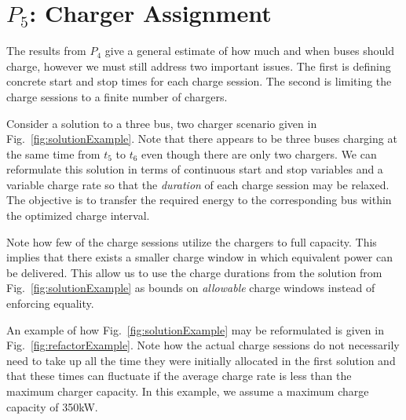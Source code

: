




\section{$P_5$: Charger Assignment\label{sec:chargerAssignment}}

The results from $P_4$ give a general estimate of how much and when buses should charge, however we must still address two important issues. The first is defining concrete start and stop times for each charge session. The second is limiting the charge sessions to a finite number of chargers.

\par Consider a solution to a three bus, two charger scenario given in Fig.~\ref{fig:solutionExample}.
Note that there appears to be three buses charging at the same time from $t_5$ to $t_6$ even though there are only two chargers.  We can reformulate this solution in terms of continuous start and stop variables and a variable charge rate so that the {\it duration} of each charge session may be relaxed. The objective is to transfer the required energy to the corresponding bus within the optimized charge interval.

\par Note how few of the charge sessions utilize the chargers to full capacity. This implies that there exists a smaller charge window in which equivalent power can be delivered. This allow us to use the charge durations from the solution from Fig.~\ref{fig:solutionExample} as bounds on {\it allowable} charge windows instead of enforcing equality.

\par An example of how Fig.~\ref{fig:solutionExample} may be reformulated is given in Fig.~\ref{fig:refactorExample}. Note how the actual charge sessions do not necessarily need to take up all the time they were initially allocated in the first solution and that these times can fluctuate if the average charge rate is less than the maximum charger capacity. In this example, we assume a maximum charge capacity of 350kW.

